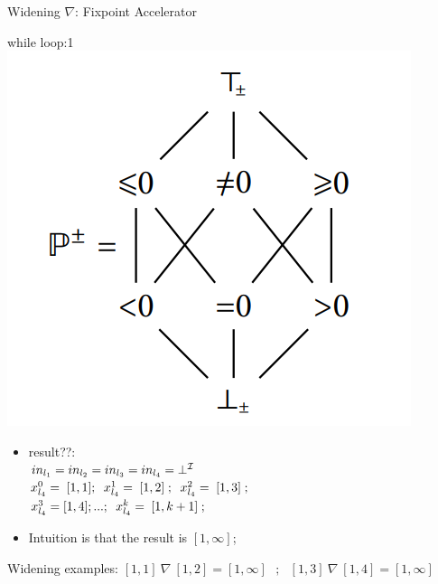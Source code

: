 \begin{frame}{Widening $\nabla$: Fixpoint Accelerator}

\begin{exampleblock}{while loop:1}
	\centering 
	\centering \includegraphics[scale=0.60]{content/images/static-analysis/sign1.png}
	
	\begin{itemize}
		\item result??: 
		\\ $\scriptsize in_{l_1}=in_{l_2}=in_{l_3}=in_{l_4}=\bot^{\mathcal{I}}$
		\\ $\scriptsize x_{l_4}^0 = ~[1,1] ;~~x_{l_4}^1 =~[1,2]~;~~x_{l_4}^2 =~[1,3]~;$
		\\ $\scriptsize x_{l_4}^3 = [1,4] ;...;~~x_{l_4}^k =~[1,k+1]~;$
		\item Intuition is that the result is $[1,\infty]$;
	\end{itemize}

\end{exampleblock}
\begin{exampleblock}{Widening examples:}
	$[1,1]~\nabla~[1,2]=[1,\infty] ~~~;~~~[1,3]~\nabla~[1,4]=[1,\infty]$\\
\end{exampleblock}
\end{frame}
